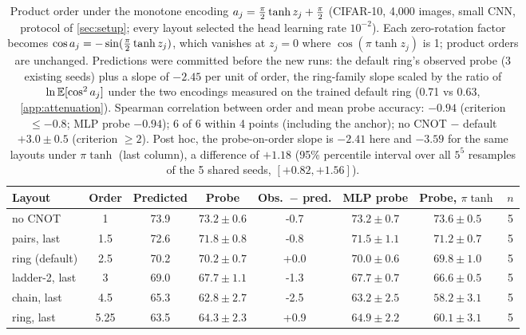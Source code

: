 \begin{table}[h]
\centering
\caption{Product order under the monotone encoding $a_{j}=\tfrac{\pi}{2}\tanh z_j+\tfrac{\pi}{2}$
(CIFAR-10, 4,000 images, small CNN, protocol of \cref{sec:setup}; every layout selected the head
learning rate $10^{-2}$). Each zero-rotation factor becomes $\cos a_{j}=-\sin(\tfrac{\pi}{2}\tanh
z_j)$, which vanishes at $z_j=0$ where $\cos(\pi\tanh z_j)$ is 1; product orders are unchanged.
Predictions were committed before the new runs: the default ring's observed probe (3 existing seeds) plus a
slope of $-2.45$ per unit of order, the ring-family slope scaled by the ratio of
$\ln\mathbb{E}[\cos^2a_{j}]$ under the two encodings measured on the trained default ring (0.71
vs 0.63, \cref{app:attenuation}). Spearman correlation between order and mean probe accuracy: $-0.94$ (criterion $\le-0.8$; MLP probe $-0.94$); 6 of 6 within 4 points (including the anchor); no CNOT $-$ default $+3.0 \pm 0.5$ (criterion $\ge2$). Post hoc, the
probe-on-order slope is $-2.41$ here and $-3.59$ for the same layouts under
$\pi\tanh$ (last column), a difference of $+1.18$ (95\% percentile interval over all $5^5$ resamples of the 5 shared seeds,
$[+0.82,+1.56]$).}
\label{tab:encoding}
\small
\begin{tabular}{lccccccc}
\toprule
Layout & Order & Predicted & Probe & Obs.\ $-$ pred. & MLP probe & Probe, $\pi\tanh$ & $n$ \\
\midrule
no CNOT & 1 & 73.9 & $73.2 \pm 0.6$ & -0.7 & $73.2 \pm 0.7$ & $73.6 \pm 0.5$ & 5 \\
pairs, last & 1.5 & 72.6 & $71.8 \pm 0.8$ & -0.8 & $71.5 \pm 1.1$ & $71.2 \pm 0.7$ & 5 \\
ring (default) & 2.5 & 70.2 & $70.2 \pm 0.7$ & +0.0 & $70.0 \pm 0.6$ & $69.8 \pm 1.0$ & 5 \\
ladder-2, last & 3 & 69.0 & $67.7 \pm 1.1$ & -1.3 & $67.7 \pm 0.7$ & $66.6 \pm 0.5$ & 5 \\
chain, last & 4.5 & 65.3 & $62.8 \pm 2.7$ & -2.5 & $63.2 \pm 2.5$ & $58.2 \pm 3.1$ & 5 \\
ring, last & 5.25 & 63.5 & $64.3 \pm 2.3$ & +0.9 & $64.9 \pm 2.2$ & $60.1 \pm 3.1$ & 5 \\
\bottomrule
\end{tabular}
\end{table}
